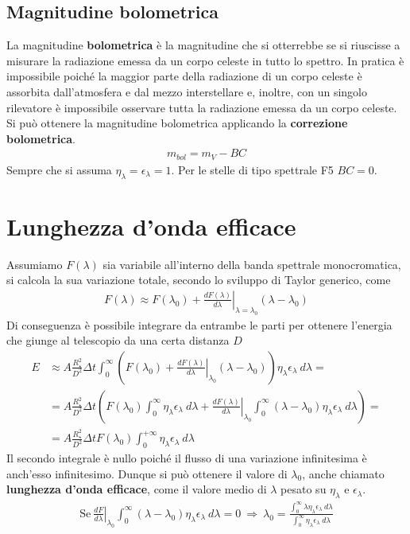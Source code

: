 \documentclass[a4paper, oneside]{book}
\begin{document}
\subsection{Magnitudine bolometrica}
La magnitudine \textbf{bolometrica} è la magnitudine che si otterrebbe se
si riuscisse a misurare la radiazione emessa da un corpo celeste in tutto lo spettro. 
In pratica è impossibile poiché la maggior parte della radiazione di un corpo celeste è 
assorbita dall'atmosfera e dal mezzo interstellare e, inoltre, con un singolo rilevatore
è impossibile osservare tutta la radiazione emessa da un corpo celeste. Si può ottenere
la magnitudine bolometrica applicando la \textbf{correzione bolometrica}. 
\begin{align}
    m_{bol} = m_V - BC
\end{align}
Sempre che si assuma $\eta_\lambda = \epsilon_\lambda = 1$. Per le stelle di tipo 
spettrale F5 $BC = 0$. 

\section{Lunghezza d'onda efficace}
Assumiamo $F(\lambda)$  sia variabile all'interno della banda spettrale monocromatica,
si calcola la sua variazione totale, secondo lo sviluppo di Taylor generico, come
\begin{gather*}
    F(\lambda) \approx F(\lambda_0) + \left.\frac{dF(\lambda)}{d\lambda}\right|_{\lambda = \lambda_0} (\lambda - \lambda_0 )
\end{gather*}
Di conseguenza è possibile integrare da entrambe le parti per ottenere l'energia che giunge
al telescopio da una certa distanza $D$
\begin{align*}
    E  &\approx A\frac{R_{\star}^{2} }{D^{2} }\Delta t \int_{0}^{\infty } \left(F(\lambda_0) + \left.\frac{dF(\lambda)}{d\lambda}\right|_{\lambda_0}(\lambda - \lambda_0)\right) \eta_\lambda \epsilon_\lambda \ d\lambda = \\
    &= A \frac{R_{\star}^{2} }{D^{2} } \Delta t \left(F(\lambda_0)\int_{0}^{\infty }\eta_\lambda \epsilon_\lambda \ d\lambda + \left.\frac{dF(\lambda)}{d\lambda}\right|_{\lambda_0}\int_{0}^{\infty } (\lambda - \lambda_0)\eta_\lambda \epsilon_\lambda \ d\lambda\right) = \\
    &= A \frac{R_\star^{2}}{D^{2}}\Delta t F(\lambda_0)\int_{0}^{+\infty } \eta_\lambda \epsilon_\lambda \ d\lambda  
\end{align*}
Il secondo integrale è nullo poiché il flusso di una variazione infinitesima è
anch'esso infinitesimo. Dunque si può ottenere il valore di $\lambda_0$, anche chiamato \textbf{lunghezza d'onda efficace}, 
come il valore medio di $\lambda$ pesato su $\eta_\lambda$ e $\epsilon_\lambda$. 
\begin{gather*}
    \text{Se} \ \left. \frac{dF}{d\lambda} \right|_{\lambda_0} \int_{0}^{\infty } (\lambda - \lambda_0) \eta_\lambda \epsilon_\lambda \ d\lambda = 0 \ \Longrightarrow \   \lambda_0 = \frac{\displaystyle \int_{0}^{\infty }\lambda\eta_\lambda \epsilon_\lambda \ d\lambda}{\displaystyle \int_{0}^{\infty }\eta_\lambda \epsilon_\lambda \ d\lambda}
\end{gather*}
\end{document}
